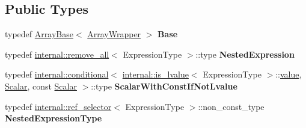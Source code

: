 \subsection*{Public Types}
\begin{DoxyCompactItemize}
\item 
\mbox{\label{class_eigen_1_1_array_wrapper_aac464fa56eeb9fffd4fec324eb8b338c}} 
typedef \mbox{\hyperlink{class_eigen_1_1_array_base}{Array\+Base}}$<$ \mbox{\hyperlink{class_eigen_1_1_array_wrapper}{Array\+Wrapper}} $>$ {\bfseries Base}
\item 
\mbox{\label{class_eigen_1_1_array_wrapper_afb25ac421397b4e70b58c02ec6d9f61d}} 
typedef \mbox{\hyperlink{struct_eigen_1_1internal_1_1remove__all}{internal\+::remove\+\_\+all}}$<$ Expression\+Type $>$\+::type {\bfseries Nested\+Expression}
\item 
\mbox{\label{class_eigen_1_1_array_wrapper_af6dd8073d5d2a712a9e85efb3f846a3f}} 
typedef \mbox{\hyperlink{struct_eigen_1_1internal_1_1conditional}{internal\+::conditional}}$<$ \mbox{\hyperlink{struct_eigen_1_1internal_1_1is__lvalue}{internal\+::is\+\_\+lvalue}}$<$ Expression\+Type $>$\+::\mbox{\hyperlink{class_eigen_1_1_dense_base_a8da735a6bfc7012606acf787156d10a0}{value}}, \mbox{\hyperlink{class_eigen_1_1_dense_base_a5feed465b3a8e60c47e73ecce83e39a2}{Scalar}}, const \mbox{\hyperlink{class_eigen_1_1_dense_base_a5feed465b3a8e60c47e73ecce83e39a2}{Scalar}} $>$\+::type {\bfseries Scalar\+With\+Const\+If\+Not\+Lvalue}
\item 
\mbox{\label{class_eigen_1_1_array_wrapper_aa4c30d28dcc6e08315eb85850d1c4d28}} 
typedef \mbox{\hyperlink{struct_eigen_1_1internal_1_1ref__selector}{internal\+::ref\+\_\+selector}}$<$ Expression\+Type $>$\+::non\+\_\+const\+\_\+type {\bfseries Nested\+Expression\+Type}
\end{DoxyCompactItemize}
